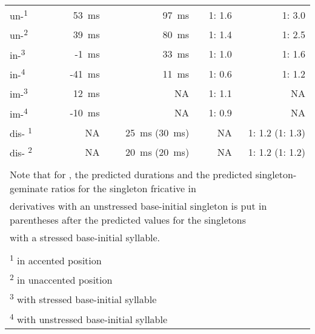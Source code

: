 \begin{table}
{\begin{tabular} {lrrrr}
				\midrule			
				un-\textsuperscript{1}& 53~ms & 97~ms   &  1: 1.6&1: 3.0\\ 
				un-\textsuperscript{2}& 39~ms & 80~ms   & 1: 1.4&1: 2.5\\ 
				
				in-\textsuperscript{3}&-1~ms &33~ms&1: 1.0&1: 1.6\\ 
				in-\textsuperscript{4}&-41~ms &11~ms&  1: 0.6& 1: 1.2\\ 
				
				im-\textsuperscript{3}&12~ms &NA  &  1: 1.1&NA \\ 
				im-\textsuperscript{4}&-10~ms &NA  & 1: 0.9 & NA\\ 
				
				dis- \textsuperscript{1}&NA & 25~ms  (30~ms)&NA &1: 1.2 (1: 1.3)   \\
				dis- \textsuperscript{2}&NA & 20~ms  (20~ms)& NA& 1: 1.2 (1: 1.2) \\
				
				
				\midrule
				\\
				\multicolumn{5}{l}{ \footnotesize{Note that for \prefix{dis}, the predicted durations and the predicted singleton-geminate ratios for the singleton fricative in}}\\
				\multicolumn{5}{l}{ \footnotesize{derivatives with an unstressed base-initial singleton is put in parentheses after the predicted values for the singletons}}\\
				\multicolumn{5}{l}{ \footnotesize{with a stressed base-initial syllable.}}\\
				\\				
				\multicolumn{5}{l}{\textsuperscript{1} \footnotesize{in accented position}}\\
				\multicolumn{5}{l}{\textsuperscript{2} \footnotesize{in unaccented position}}\\
				\multicolumn{5}{l}{\textsuperscript{3} \footnotesize{with stressed base-initial syllable}}\\
				\multicolumn{5}{l}{\textsuperscript{4} \footnotesize{with unstressed base-initial syllable}}\\

			\end{tabular}
		}
	
	
	
	
\end{table}





